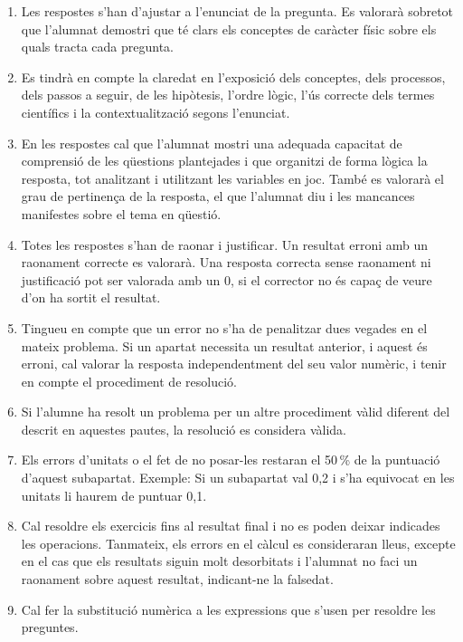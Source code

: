 \begin{enumerate}
  \item Les respostes s'han d'ajustar a l'enunciat de la pregunta. Es valorarà sobretot que l'alumnat demostri que té clars els conceptes de caràcter físic sobre els quals tracta cada pregunta.
  \item Es tindrà en compte la claredat en l'exposició dels conceptes, dels processos, dels passos a seguir, de les hipòtesis, l'ordre lògic, l'ús correcte dels termes científics i la contextualització segons l'enunciat.
  \item En les respostes cal que l'alumnat mostri una adequada capacitat de comprensió de les qüestions plantejades i que organitzi de forma lògica la resposta, tot analitzant i utilitzant les variables en joc. També es valorarà el grau de pertinença de la resposta, el que l'alumnat diu i les mancances manifestes sobre el tema en qüestió.
  \item Totes les respostes s'han de raonar i justificar. Un resultat erroni amb un raonament correcte es valorarà. Una resposta correcta sense raonament ni justificació pot ser valorada amb un 0, si el corrector no és capaç de veure d'on ha sortit el resultat.
  \item Tingueu en compte que un error no s'ha de penalitzar dues vegades en el mateix problema. Si un apartat necessita un resultat anterior, i aquest és erroni, cal valorar la resposta independentment del seu valor numèric, i tenir en compte el procediment de resolució.
  \item Si l'alumne ha resolt un problema per un altre procediment vàlid diferent del descrit en aquestes pautes, la resolució es considera vàlida.
  \item Els errors d'unitats o el fet de no posar-les restaran el 50\,\% de la puntuació d'aquest subapartat. Exemple: Si un subapartat val 0,2 i s'ha equivocat en les unitats li haurem de puntuar 0,1.
  \item Cal resoldre els exercicis fins al resultat final i no es poden deixar indicades les operacions. Tanmateix, els errors en el càlcul es consideraran lleus, excepte en el cas que els resultats siguin molt desorbitats i l'alumnat no faci un raonament sobre aquest resultat, indicant-ne la falsedat.
  \item Cal fer la substitució numèrica a les expressions que s'usen per resoldre les preguntes.
\end{enumerate}

